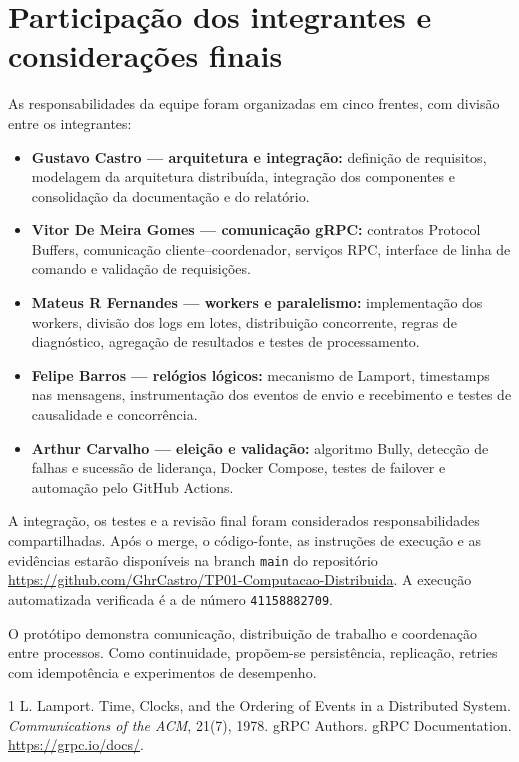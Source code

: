 \documentclass[12pt]{article}
\begin{document}
\section{Participa\c{c}\~ao dos integrantes e considera\c{c}\~oes finais}
As responsabilidades da equipe foram organizadas em cinco frentes, com divis\~ao entre os integrantes:

\begin{itemize}
\setlength{\itemsep}{1pt}
\setlength{\parsep}{0pt}
\item \textbf{Gustavo Castro --- arquitetura e integra\c{c}\~ao:} defini\c{c}\~ao de requisitos, modelagem da arquitetura distribu\'ida, integra\c{c}\~ao dos componentes e consolida\c{c}\~ao da documenta\c{c}\~ao e do relat\'orio.
\item \textbf{Vitor De Meira Gomes --- comunica\c{c}\~ao gRPC:} contratos Protocol Buffers, comunica\c{c}\~ao cliente--coordenador, servi\c{c}os RPC, interface de linha de comando e valida\c{c}\~ao de requisi\c{c}\~oes.
\item \textbf{Mateus R Fernandes --- workers e paralelismo:} implementa\c{c}\~ao dos workers, divis\~ao dos logs em lotes, distribui\c{c}\~ao concorrente, regras de diagn\'ostico, agrega\c{c}\~ao de resultados e testes de processamento.
\item \textbf{Felipe Barros --- rel\'ogios l\'ogicos:} mecanismo de Lamport, timestamps nas mensagens, instrumenta\c{c}\~ao dos eventos de envio e recebimento e testes de causalidade e concorr\^encia.
\item \textbf{Arthur Carvalho --- elei\c{c}\~ao e valida\c{c}\~ao:} algoritmo Bully, detec\c{c}\~ao de falhas e sucess\~ao de lideran\c{c}a, Docker Compose, testes de failover e automa\c{c}\~ao pelo GitHub Actions.
\end{itemize}

A integra\c{c}\~ao, os testes e a revis\~ao final foram considerados responsabilidades compartilhadas. Ap\'os o merge, o c\'odigo-fonte, as instru\c{c}\~oes de execu\c{c}\~ao e as evid\^encias estar\~ao dispon\'iveis na branch \texttt{main} do reposit\'orio \url{https://github.com/GhrCastro/TP01-Computacao-Distribuida}. A execu\c{c}\~ao automatizada verificada \'e a de n\'umero \texttt{41158882709}.

O prot\'otipo demonstra comunica\c{c}\~ao, distribui\c{c}\~ao de trabalho e coordena\c{c}\~ao entre processos. Como continuidade, prop\~oem-se persist\^encia, replica\c{c}\~ao, retries com idempot\^encia e experimentos de desempenho.

\begin{thebibliography}{1}
 L. Lamport. Time, Clocks, and the Ordering of Events in a Distributed System. \textit{Communications of the ACM}, 21(7), 1978.
 gRPC Authors. gRPC Documentation. \url{https://grpc.io/docs/}.
\end{thebibliography}
\end{document}
